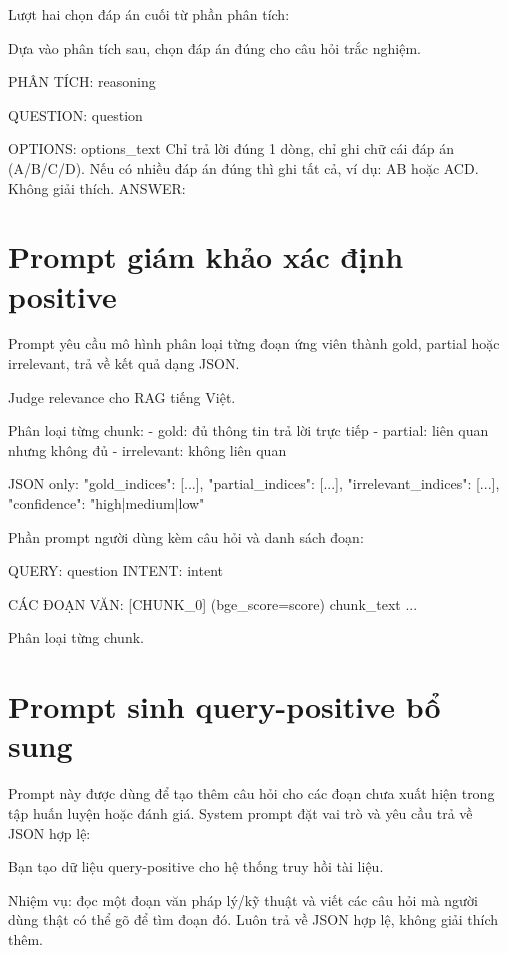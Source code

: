 Lượt hai chọn đáp án cuối từ phần phân tích:

\begin{promptbox}
Dựa vào phân tích sau, chọn đáp án đúng cho câu hỏi trắc nghiệm.

PHÂN TÍCH:
{reasoning}

QUESTION:
{question}

OPTIONS:
{options_text}
Chỉ trả lời đúng 1 dòng, chỉ ghi chữ cái đáp án (A/B/C/D).
Nếu có nhiều đáp án đúng thì ghi tất cả, ví dụ: AB hoặc ACD.
Không giải thích.
ANSWER:
\end{promptbox}

\section{Prompt giám khảo xác định positive}
\label{appendix:C.3}

Prompt yêu cầu mô hình phân loại từng đoạn ứng viên thành gold, partial hoặc irrelevant, trả về kết quả dạng JSON.

\begin{promptbox}
Judge relevance cho RAG tiếng Việt.

Phân loại từng chunk:
- gold:       đủ thông tin trả lời trực tiếp
- partial:    liên quan nhưng không đủ
- irrelevant: không liên quan

JSON only:
{"gold_indices": [...], "partial_indices": [...],
 "irrelevant_indices": [...], "confidence": "high|medium|low"}
\end{promptbox}

Phần prompt người dùng kèm câu hỏi và danh sách đoạn:

\begin{promptbox}
QUERY: {question}
INTENT: {intent}

CÁC ĐOẠN VĂN:
[CHUNK_0] (bge_score={score})
{chunk_text}
...

Phân loại từng chunk.
\end{promptbox}

\section{Prompt sinh query-positive bổ sung}
\label{appendix:C.4}

Prompt này được dùng để tạo thêm câu hỏi cho các đoạn chưa xuất hiện trong tập huấn luyện hoặc đánh giá. System prompt đặt vai trò và yêu cầu trả về JSON hợp lệ:

\begin{promptbox}
Bạn tạo dữ liệu query-positive cho hệ thống truy hồi tài liệu.

Nhiệm vụ: đọc một đoạn văn pháp lý/kỹ thuật và viết các câu hỏi mà người dùng thật có thể gõ để tìm đoạn đó.
Luôn trả về JSON hợp lệ, không giải thích thêm.
\end{promptbox}

